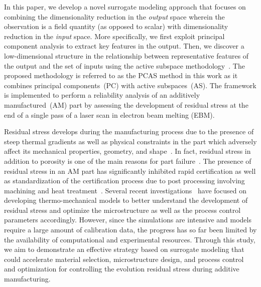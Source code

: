 In this paper, we develop a novel surrogate modeling approach that focuses on combining the dimensionality reduction
in the \textit{output}
space wherein the observation is a field quantity (as opposed to scalar) with dimensionality reduction in the \textit{input} 
space. More specifically, we first exploit principal component analysis to extract key features in the output. Then, we 
discover a 
low-dimensional structure in the relationship between representative features of the output and the set of inputs using
the active
subspace methodology~\cite{Constantine:2015}. The proposed methodology is
referred to as the PCAS method in this work as it combines principal components~(PC) with active subspaces~(AS).
The framework is implemented to
perform a reliability analysis of an additively manufactured~(AM) part by assessing the development of residual stress
at the end of a single pass of a laser scan in electron beam melting (EBM). 

Residual stress develops during the manufacturing process due to the presence of steep thermal gradients as
well as physical constraints in the part which adversely affect its mechanical properties, geometry, and 
shape~\cite{Withers:2001,Mercelis:2006,Hofmann:2014}. 
In fact, residual stress in addition to porosity is one of the main reasons for 
part failure~\cite{Kim:2018}. The presence of residual stress in an AM part has significantly 
inhibited rapid certification as well as standardization of the certification process
due to post processing involving machining and heat treatment~\cite{Shiomi:2004}.
Several recent investigations~\cite{Vastola:2016,Hodge:2016,Williams:2018}
have focused on developing thermo-mechanical
models to better understand the development of residual stress and optimize the microstructure as well as
the process control parameters accordingly. However, since the simulations are intensive and models require a 
large amount of calibration data, the progress has so far been limited by the availability
of computational and experimental resources. Through this study, we aim to demonstrate an effective strategy
based on surrogate modeling that could accelerate material selection, microstructure design, and
process control and optimization for controlling the evolution residual stress during additive manufacturing. 

